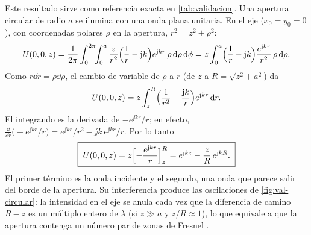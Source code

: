 Este resultado sirve como referencia exacta en \cref{tab:validacion}. Una apertura
circular de radio $a$ se ilumina con una onda plana unitaria. En el eje ($x_0=y_0=0$), con
coordenadas polares $\rho$ en la apertura, $r^2=z^2+\rho^2$:
\[
  U(0,0,z)=\frac{1}{2\pi}\int_0^{2\pi}\!\!\int_0^a\frac{z}{r^2}\Bigl(\frac1r-\mathrm{j} k\Bigr)e^{\mathrm{j} kr}\,\rho\,\mathrm{d}\rho\,\mathrm{d}\phi
  =z\int_0^a\Bigl(\frac1r-\mathrm{j} k\Bigr)\frac{e^{\mathrm{j} kr}}{r^2}\,\rho\,\mathrm{d}\rho .
\]
Como $r\dd r=\rho\dd\rho$, el cambio de variable de $\rho$ a $r$ (de $z$ a $R=\sqrt{z^2+a^2}$) da
\[
  U(0,0,z)=z\int_z^R\Bigl(\frac{1}{r^2}-\frac{\mathrm{j} k}{r}\Bigr)e^{\mathrm{j} kr}\,\mathrm{d} r .
\]
El integrando es la derivada de $-e^{\jj kr}/r$; en efecto,
$\frac{\dd}{\dd r}\bigl(-e^{\jj kr}/r\bigr)=e^{\jj kr}/r^2-\jj k\,e^{\jj kr}/r$. Por lo tanto
\begin{equation}
  \boxed{\;U(0,0,z)=z\Bigl[-\frac{e^{\mathrm{j} kr}}{r}\Bigr]_z^R=e^{\mathrm{j} kz}-\frac{z}{R}\,e^{\mathrm{j} kR}.\;}
  \label{eq:circular}
\end{equation}
El primer término es la onda incidente y el segundo, una onda que parece salir del borde de la
apertura. Su interferencia produce las oscilaciones de \cref{fig:val-circular}: la
intensidad en el eje se anula cada vez que la diferencia de camino $R-z$ es un múltiplo entero
de $\lambda$ (si $z\gg a$ y $z/R\approx1$), lo que equivale a que la apertura contenga un número
par de zonas de Fresnel \parencite[sec.~10.3]{hecht2017}.
